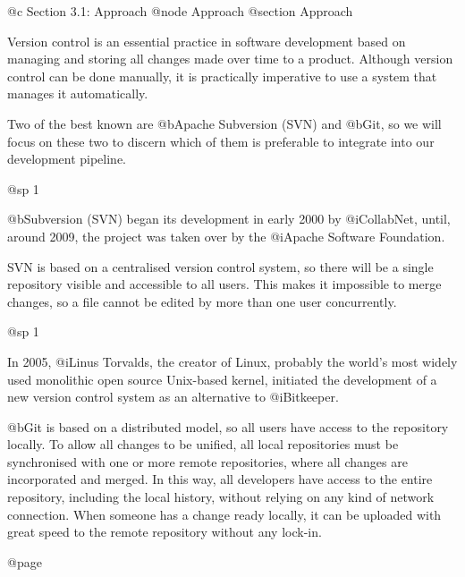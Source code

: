 @c Section 3.1: Approach
@node Approach
@section Approach

Version control is an essential practice in software development based on managing and storing all changes made over time to a product.
Although version control can be done manually, it is practically imperative to use a system that manages it automatically.

Two of the best known are @b{Apache Subversion (SVN)} and @b{Git}, so we will focus on these two to discern which of them is preferable to integrate into our development pipeline.

@sp 1

@b{Subversion (SVN)} began its development in early 2000 by @i{CollabNet}, until, around 2009, the project was taken over by the @i{Apache Software Foundation}.

SVN is based on a centralised version control system, so there will be a single repository visible and accessible to all users. This makes it impossible to merge changes, so a file cannot be edited by more than one user concurrently.

@sp 1

In 2005, @i{Linus Torvalds}, the creator of Linux, probably the world's most widely used monolithic open source Unix-based kernel, initiated the development of a new version control system as an alternative to @i{Bitkeeper}.

@b{Git} is based on a distributed model, so all users have access to the repository locally. To allow all changes to be unified, all local repositories must be synchronised with one or more remote repositories, where all changes are incorporated and merged.
In this way, all developers have access to the entire repository, including the local history, without relying on any kind of network connection. When someone has a change ready locally, it can be uploaded with great speed to the remote repository without any lock-in.

@page
